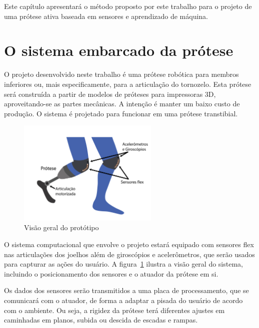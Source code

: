 Este capítulo apresentará o método proposto por este trabalho para o projeto de uma prótese ativa baseada em sensores e aprendizado de máquina.

\section{O sistema embarcado da prótese}
\label{sec:metodo_protese}

O projeto desenvolvido neste trabalho é uma prótese robótica para membros inferiores ou, mais especificamente, para a articulação do tornozelo. Esta prótese será construída a partir de modelos de próteses para impressoras 3D, aproveitando-se as partes mecânicas. A intenção é manter um baixo custo de produção. O sistema é projetado para funcionar em uma prótese transtibial.

\begin{figure}[h]
	\caption{\label{fig:big_picture}Visão geral do protótipo}
	\begin{center}
	    \includegraphics[width=0.6\textwidth]{resources/big_picture}
	\end{center}
\end{figure}

O sistema computacional que envolve o projeto estará equipado com sensores flex nas articulações dos joelhos além de giroscópios e acelerômetros, que serão usados para capturar as ações do usuário. A figura~\ref{fig:big_picture} ilustra a visão geral do sistema, incluindo o posicionamento dos sensores e o atuador da prótese em si.

Os dados dos sensores serão transmitidos a uma placa de processamento, que se comunicará com o atuador, de forma a adaptar a pisada do usuário de acordo com o ambiente. Ou seja, a rigidez da prótese terá diferentes ajustes em caminhadas em planos, subida ou descida de escadas e rampas.

